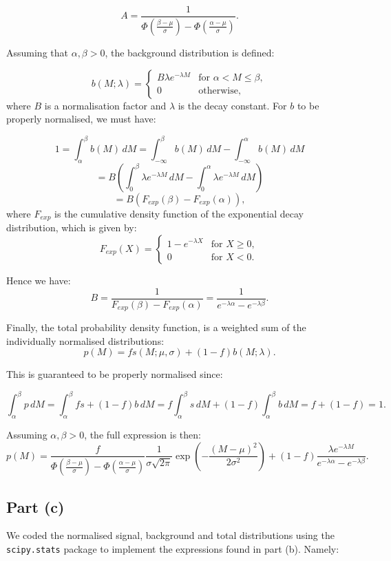 \documentclass{article}
\begin{document}
\[
A = \frac{1}{\Phi(\frac{\beta-\mu}{\sigma}) - \Phi(\frac{\alpha-\mu}{\sigma})}.
\]

Assuming that $\alpha, \beta > 0$, the background distribution is defined:

\[ 
b(M; \lambda) = 
\begin{cases} 
B\lambda e^{-\lambda M} & \text{for } \alpha < M \leq \beta, \\
0 & \text{otherwise},
\end{cases}
\]
where $B$ is a normalisation factor and $\lambda$ is the decay constant. For $b$ to be properly normalised, we must have:

\[
1 = \int_{\alpha}^{\beta} b(M) \, dM 
= 
\int_{-\infty}^{\beta} b(M) \, dM - \int_{-\infty}^{\alpha} b(M) \, dM
\]
\[
= B \left( 
\int_{0}^{\beta} \lambda e^{-\lambda M} \, dM - 
\int_{0}^{\alpha} \lambda e^{-\lambda M} \, dM
\right)
\]
\[
= B (F_{exp}(\beta) - F_{exp}(\alpha)),
\]
where $F_{exp}$ is the cumulative density function of the exponential decay distribution, which is given by:
\[
F_{exp}(X) = 
\begin{cases} 
1 - e^{-\lambda X} & \text{for } X \geq 0, \\
0 & \text{for } X < 0.
\end{cases}
\]

Hence we have:
\[
B = \frac{1}{F_{exp}(\beta) - F_{exp}(\alpha)} 
= \frac{1}{e^{-\lambda\alpha} - e^{-\lambda \beta}}.
\]

Finally, the total probability density function, is a weighted sum of the individually normalised distributions:
\[
p(M) = 
fs(M; \mu, \sigma) + (1-f)b(M; \lambda).
\]

This is guaranteed to be properly normalised since:

\[ 
\int_{\alpha}^{\beta} p \, dM = 
\int_{\alpha}^{\beta} fs + (1-f)b \, dM =
f\int_{\alpha}^{\beta} s \, dM + 
(1-f)\int_{\alpha}^{\beta} b \, dM
= f + (1-f) = 1.
\]

Assuming $\alpha, \beta > 0$, the full expression is then:
\[
p(M) = 
\frac{f}{\Phi(\frac{\beta-\mu}{\sigma}) - \Phi(\frac{\alpha-\mu}{\sigma})}
\frac{1}{\sigma\sqrt{2\pi}}
\exp\left(-\frac{(M - \mu)^2}{2\sigma^2}\right)
+
(1-f)
\frac{\lambda e^{-\lambda M}}
{e^{-\lambda\alpha} - e^{-\lambda\beta}}
.
\]

\subsection*{Part (c)}

We coded the normalised signal, background and total distributions using the \texttt{scipy.stats} package to implement the expressions found in part (b). Namely:
\end{document}
